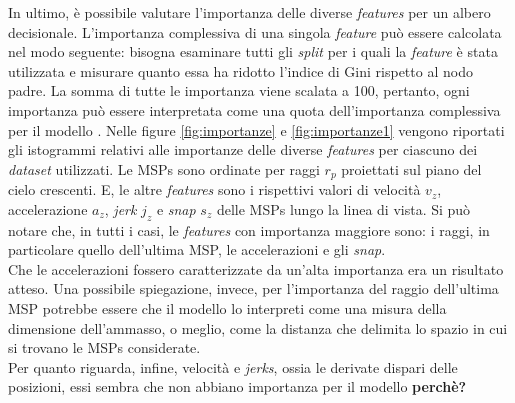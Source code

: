 In ultimo, è possibile valutare l'importanza delle diverse \textit{features} per un albero decisionale. L'importanza complessiva di una singola \textit{feature} può essere calcolata nel modo seguente: bisogna esaminare tutti gli \textit{split} per i quali la \textit{feature} è stata utilizzata e misurare quanto essa ha ridotto l'indice di Gini rispetto al nodo padre. La somma di tutte le importanza viene scalata a 100, pertanto, ogni importanza può essere interpretata come una quota dell'importanza complessiva per il modello \cite{molnar2019:book}. Nelle figure \ref{fig:importanze} e \ref{fig:importanze1} vengono riportati gli istogrammi relativi alle importanze delle diverse \textit{features} per ciascuno dei \textit{dataset} utilizzati. Le MSPs sono ordinate per raggi $r_{p}$ proiettati sul piano del cielo crescenti. E, le altre \textit{features} sono i rispettivi valori di velocità $v_z$, accelerazione $a_z$, \textit{jerk} $j_z$ e \textit{snap} $s_z$ delle MSPs lungo la linea di vista. Si può notare che, in tutti i casi, le \textit{features} con importanza maggiore sono: i raggi, in particolare quello dell'ultima MSP, le accelerazioni e gli \textit{snap}.\\
Che le accelerazioni fossero caratterizzate da un'alta importanza era un risultato atteso. Una possibile spiegazione, invece, per l'importanza del raggio dell'ultima MSP potrebbe essere che il modello lo interpreti come una misura della dimensione dell'ammasso, o meglio, come la distanza che delimita lo spazio in cui si trovano le MSPs considerate.\\
Per quanto riguarda, infine, velocità e \textit{jerks}, ossia le derivate dispari delle posizioni, essi sembra che non abbiano importanza per il modello \textbf{perchè?}

